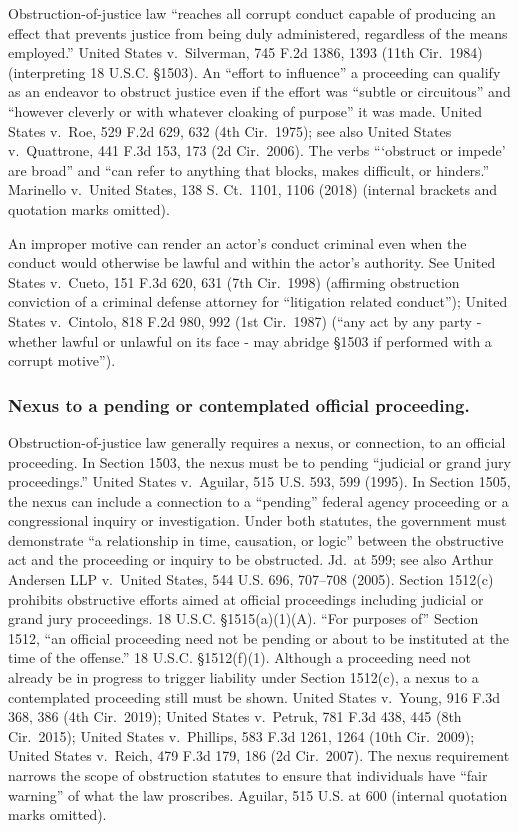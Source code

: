 Obstruction-of-justice law “reaches all corrupt conduct capable of producing an effect that prevents justice from being duly administered, regardless of the means employed.”
United States v.\ Silverman, 745 F.2d 1386, 1393 (11th Cir.~1984) (interpreting 18 U.S.C. \S 1503).
An “effort to influence” a proceeding can qualify as an endeavor to obstruct justice even if the effort was “subtle or circuitous” and “however cleverly or with whatever cloaking of purpose” it was made.
United States v.\ Roe, 529 F.2d 629, 632 (4th Cir.~1975);
see also United States v.\ Quattrone, 441 F.3d 153, 173 (2d Cir.~2006).
The verbs “‘obstruct or impede’ are broad” and “can refer to anything that blocks, makes difficult, or hinders.”
Marinello v.\ United States, 138 S. Ct.~1101, 1106 (2018) (internal brackets and quotation marks omitted).

An improper motive can render an actor’s conduct criminal even when the conduct would otherwise be lawful and within the actor’s authority.
See United States v.\ Cueto, 151 F.3d 620, 631 (7th Cir.~1998) (affirming obstruction conviction of a criminal defense attorney for “litigation related conduct”); United States v.\ Cintolo, 818 F.2d 980, 992 (1st Cir.~1987) (“any act by any party - whether lawful or unlawful on its face - may abridge \S 1503 if performed with a corrupt motive”).

\subsubsection*{Nexus to a pending or contemplated official proceeding.}

Obstruction-of-justice law generally requires a nexus, or connection, to an official proceeding.
In Section 1503, the nexus must be to pending “judicial or grand jury proceedings.”
United States v.\ Aguilar, 515 U.S. 593, 599 (1995).
In Section 1505, the nexus can include a connection to a “pending” federal agency proceeding or a congressional inquiry or investigation.
Under both statutes, the government must demonstrate “a relationship in time, causation, or logic” between the obstructive act and the proceeding or inquiry to be obstructed.
Jd.\ at 599; see also Arthur Andersen LLP v.\ United States, 544 U.S. 696, 707--708 (2005).
Section 1512(c) prohibits obstructive efforts aimed at official proceedings including judicial or grand jury proceedings.
18 U.S.C. \S 1515(a)(1)(A).
“For purposes of” Section 1512, “an official proceeding need not be pending or about to be instituted at the time of the offense.”
18 U.S.C. \S 1512(f)(1).
Although a proceeding need not already be in progress to trigger liability under Section 1512(c), a nexus to a contemplated proceeding still must be shown.
United States v.\ Young, 916 F.3d 368, 386 (4th Cir.~2019);
United States v.\ Petruk, 781 F.3d 438, 445 (8th Cir.~2015);
United States v.\ Phillips, 583 F.3d 1261, 1264 (10th Cir.~2009);
United States v.\ Reich, 479 F.3d 179, 186 (2d Cir.~2007).
The nexus requirement narrows the scope of obstruction statutes to ensure that individuals have “fair warning” of what the law proscribes.
Aguilar, 515 U.S. at 600 (internal quotation marks omitted).

